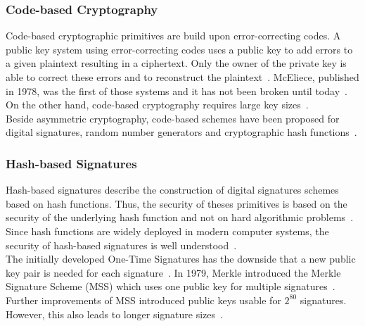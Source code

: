\subsubsection{Code-based Cryptography}
Code-based cryptographic primitives are build upon error-correcting codes. A public key system using error-correcting codes uses a public key to add errors to a given plaintext resulting in a ciphertext. Only the owner of the private key is able to correct these errors and to reconstruct the plaintext~\parencite{bernstein2017post}. McEliece, published in 1978, was the first of those systems and it has not been broken until today~\parencite{mceliece1978public}. On the other hand, code-based cryptography requires large key sizes~\parencite{bernstein2017post}.\\
Beside asymmetric cryptography, code-based schemes have been proposed for digital signatures, random number generators and cryptographic hash functions~\parencite{bernstein2017post}.
\subsubsection{Hash-based Signatures}
Hash-based signatures describe the construction of digital signatures schemes based on hash functions. Thus, the security of theses primitives is based on the security of the underlying hash function and not on hard algorithmic problems~\parencite{bernstein2017post}. Since hash functions are widely deployed in modern computer systems, the security of hash-based signatures is well understood~\parencite{chen2016report}.\\
The initially developed One-Time Signatures has the downside that a new public key pair is needed for each signature~\parencite{becker2008merkle}. In 1979, Merkle introduced the Merkle Signature Scheme (MSS) which uses one public key for multiple signatures~\parencite{merkle1979secrecy}. Further improvements of MSS introduced public keys usable for $2^{80}$ signatures. However, this also leads to longer signature sizes~\parencite{becker2008merkle}.

